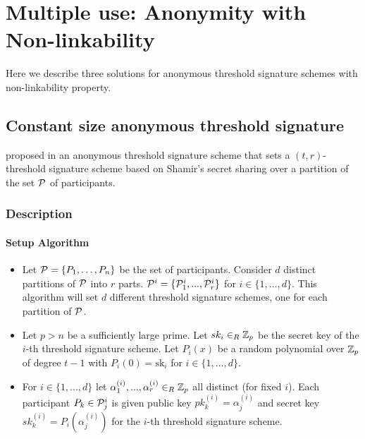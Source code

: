\chapter{Multiple use: Anonymity with Non-linkability}
\label{chap:mult}
Here we describe three solutions for anonymous threshold signature schemes with non-linkability property.

\section{Constant size anonymous threshold signature}

\citeauthor*{DazaDSV09} proposed in \cite{DazaDSV09} an anonymous threshold signature scheme that sets a $(t,r)$-threshold signature scheme based on Shamir's secret sharing over a partition of the set ${\mathcal P}$ of participants.

\subsection{Description}
\label{sec:daza}
\subsubsection*{Setup Algorithm}
\begin{itemize}[align = left, leftmargin=*, label={--}]
\item Let ${\mathcal P} = \{P_1 , \dots , P_n \}$ be the set of participants. Consider $d$ distinct partitions of ${\mathcal P}$ into $r$ parts.
${\mathcal P}^i = \{{\mathcal P}^i_1, ... , {\mathcal P}^i_r\}$ for $i \in \{1, ... , d\}$. This algorithm will set $d$ different threshold signature schemes, one for each partition of ${\mathcal P}$.

\item Let $p > n$ be a sufficiently large prime. Let $sk_i \in_R {\mathbb Z}_p$ be the secret key of the $i$-th threshold signature scheme. Let $P_i(x)$ be a random polynomial over ${\mathbb Z}_p$ of degree $t-1$ with ${P_i(0) = \mbox{sk}_i}$ for $i \in \{1, ..., d\}$.

\item For $i \in \{1, ..., d\}$ let $\alpha^{(i)}_1, ... , \alpha^{(i)}_r \in_R {\mathbb Z}_p$ all distinct (for fixed $i$). Each participant $P_k \in {\mathcal P}^i_j$ is given public key $pk^{(i)}_k = \alpha^{(i)}_j$ and secret key $sk^{(i)}_k = P_i(\alpha^{(i)}_j)$ for the $i$-th threshold signature scheme. 
\end{itemize}

